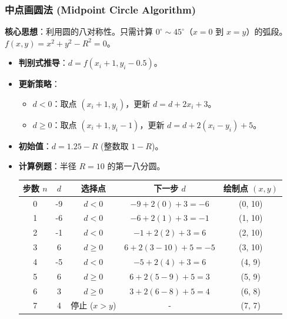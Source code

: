 \documentclass[UTF8]{ctexart}
\begin{document}
\subsubsection{中点画圆法 (Midpoint Circle Algorithm)}
\textbf{核心思想}：利用圆的八对称性。只需计算 $0^\circ \sim 45^\circ$（$x=0$ 到 $x=y$）的弧段。
$f(x,y) = x^2 + y^2 - R^2 = 0$。
\begin{itemize}
    \item \textbf{判别式推导}：$d = f(x_i+1, y_i-0.5)$。
    \item \textbf{更新策略}：
        \begin{itemize}
            \item $d < 0$：取点 $(x_i+1, y_i)$，更新 $d = d + 2x_i + 3$。
            \item $d \ge 0$：取点 $(x_i+1, y_i-1)$，更新 $d = d + 2(x_i - y_i) + 5$。
        \end{itemize}
    \item \textbf{初始值}：$d = 1.25 - R$ (整数取 $1-R$)。
    \item \textbf{计算例题}：半径 $R=10$ 的第一八分圆。
        \begin{center}
        \begin{tabular}{|c|c|c|c|c|}
            \hline
            步数 $n$ & $d$ & 选择点 & 下一步 $d$ & 绘制点 $(x, y)$ \\
            \hline
            0 & -9 & $d < 0$ & $-9+2(0)+3=-6$ & (0, 10) \\
            1 & -6 & $d < 0$ & $-6+2(1)+3=-1$ & (1, 10) \\
            2 & -1 & $d < 0$ & $-1+2(2)+3=6$ & (2, 10) \\
            3 & 6 & $d \ge 0$ & $6+2(3-10)+5=-5$ & (3, 10) \\
            4 & -5 & $d < 0$ & $-5+2(4)+3=6$ & (4, 9) \\
            5 & 6 & $d \ge 0$ & $6+2(5-9)+5=3$ & (5, 9) \\
            6 & 3 & $d \ge 0$ & $3+2(6-8)+5=4$ & (6, 8) \\
            7 & 4 & 停止 ($x > y$) & - & (7, 7) \\
            \hline
        \end{tabular}
        \end{center}
\end{itemize}
\end{document}
